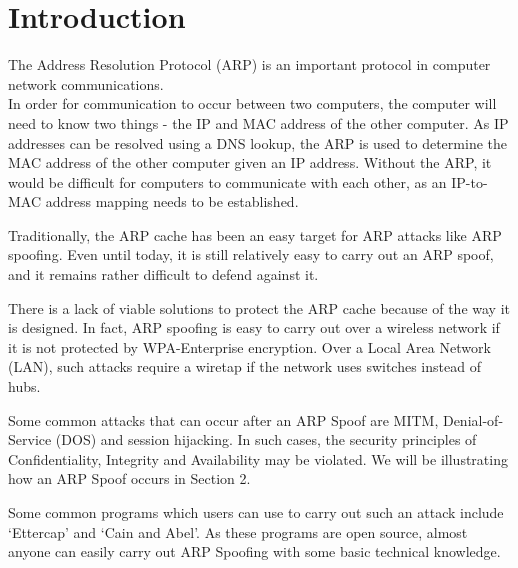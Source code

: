 \documentclass{acm_proc_article-sp}
\begin{document}




\section{Introduction}
The Address Resolution Protocol (ARP) is an important protocol in computer network communications. \\
In order for communication to occur between two computers, the computer will need to know two things - the IP and MAC address of the other computer. As IP addresses can be resolved using a DNS lookup, the ARP is used to determine the MAC address of the other computer given an IP address. Without the ARP, it would be difficult for computers to communicate with each other, as an IP-to-MAC address mapping needs to be established. 

Traditionally, the ARP cache has been an easy target for ARP attacks like ARP spoofing. Even until today, it is still relatively easy to carry out an ARP spoof, and it remains rather difficult to defend against it. 

There is a lack of viable solutions to protect the ARP cache because of the way it is designed. In fact, ARP spoofing is easy to carry out over a wireless network if it is not protected by WPA-Enterprise encryption. Over a Local Area Network (LAN), such attacks require a wiretap if the network uses switches instead of hubs. 

Some common attacks that can occur after an ARP Spoof are MITM, Denial-of-Service (DOS) and session hijacking. 
In such cases, the security principles of Confidentiality, Integrity and Availability may be violated. 
We will be illustrating how an ARP Spoof occurs in Section 2. 

Some common programs which users can use to carry out such an attack include `Ettercap' and `Cain and Abel'. As these programs are open source, almost anyone can easily carry out ARP Spoofing with some basic technical knowledge. 
\end{document}
